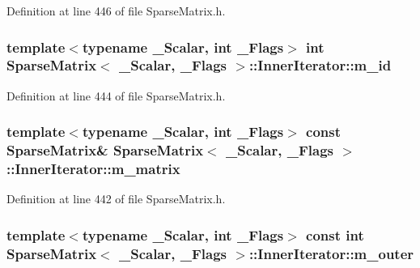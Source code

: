 Definition at line 446 of file Sparse\-Matrix.\-h.

\hypertarget{class_sparse_matrix_1_1_inner_iterator_a715fcceba7bd2cddd4a09572a81f6a3d}{
\subsubsection[{m\-\_\-id}]{\setlength{\rightskip}{0pt plus 5cm}template$<$typename \-\_\-\-Scalar, int \-\_\-\-Flags$>$ {\bf int} {\bf Sparse\-Matrix}$<$ \-\_\-\-Scalar, \-\_\-\-Flags $>$\-::Inner\-Iterator\-::m\-\_\-id\hspace{0.3cm}{\ttfamily [protected]}}}\label{class_sparse_matrix_1_1_inner_iterator_a715fcceba7bd2cddd4a09572a81f6a3d}


Definition at line 444 of file Sparse\-Matrix.\-h.

\hypertarget{class_sparse_matrix_1_1_inner_iterator_abdfdb78265864b419133fbb24a293c01}{
\subsubsection[{m\-\_\-matrix}]{\setlength{\rightskip}{0pt plus 5cm}template$<$typename \-\_\-\-Scalar, int \-\_\-\-Flags$>$ const {\bf Sparse\-Matrix}\& {\bf Sparse\-Matrix}$<$ \-\_\-\-Scalar, \-\_\-\-Flags $>$\-::Inner\-Iterator\-::m\-\_\-matrix\hspace{0.3cm}{\ttfamily [protected]}}}\label{class_sparse_matrix_1_1_inner_iterator_abdfdb78265864b419133fbb24a293c01}


Definition at line 442 of file Sparse\-Matrix.\-h.

\hypertarget{class_sparse_matrix_1_1_inner_iterator_aa6bee154b1f23cd7510a459c3bc33c9c}{
\subsubsection[{m\-\_\-outer}]{\setlength{\rightskip}{0pt plus 5cm}template$<$typename \-\_\-\-Scalar, int \-\_\-\-Flags$>$ const {\bf int} {\bf Sparse\-Matrix}$<$ \-\_\-\-Scalar, \-\_\-\-Flags $>$\-::Inner\-Iterator\-::m\-\_\-outer\hspace{0.3cm}{\ttfamily [protected]}}}\label{class_sparse_matrix_1_1_inner_iterator_aa6bee154b1f23cd7510a459c3bc33c9c}


